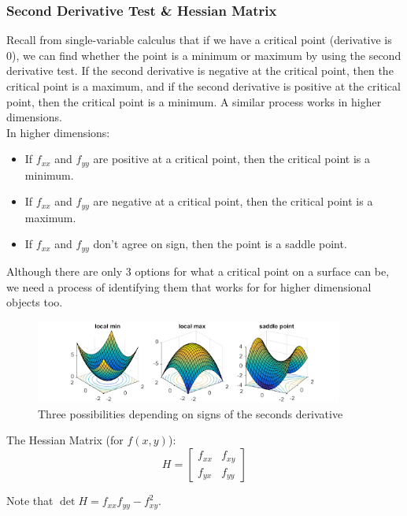 \subsubsection{Second Derivative Test \& Hessian Matrix}
\noindent
Recall from single-variable calculus that if we have a critical point (derivative is 0), we can find whether the point is a minimum or maximum by using the second derivative test.
If the second derivative is negative at the critical point, then the critical point is a maximum, and if the second derivative is positive at the critical point, then the critical point is a minimum.
A similar process works in higher dimensions.\\

\noindent
In higher dimensions:
\begin{itemize}
	\item If $f_{xx}$ and $f_{yy}$ are positive at a critical point, then the critical point is a minimum.
	\item If $f_{xx}$ and $f_{yy}$ are negative at a critical point, then the critical point is a maximum.
	\item If $f_{xx}$ and $f_{yy}$ don't agree on sign, then the point is a saddle point.
\end{itemize}

\noindent
Although there are only 3 options for what a critical point on a surface can be, we need a process of identifying them that works for for higher dimensional objects too.

\begin{figure}[H]
	\centering
	\includegraphics*[width=0.9\textwidth]{./Images/differentialMultivariableCalculus/second_derivative_test.png}
	\caption{Three possibilities depending on signs of the seconds derivative}
\end{figure}

\begin{definition}
	The Hessian Matrix (for $f(x,y)$):
	\begin{equation*}
		H = \begin{bmatrix}
			f_{xx} & f_{xy} \\
			f_{yx} & f_{yy} 
		\end{bmatrix}
	\end{equation*} 
\end{definition}
\noindent
Note that $\det{H} = f_{xx}f_{yy} - f_{xy}^2$.\\

